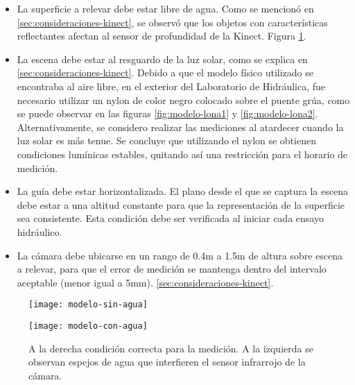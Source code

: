 \begin{itemize}

\item La superficie a relevar debe estar libre de agua. Como se mencionó en \ref{sec:consideraciones-kinect}, se observó que los objetos con características reflectantes afectan al sensor de profundidad de la Kinect. Figura \ref{fig:modelo-condiciones-agua}.

\item La escena debe estar al resguardo de la luz solar, como se explica en \ref{sec:consideraciones-kinect}. Debido a que el modelo físico utilizado se encontraba al aire libre, en el exterior del Laboratorio de Hidráulica, fue necesario utilizar un nylon de color negro colocado sobre el puente grúa, como se puede observar en las figuras \ref{fig:modelo-lona1} y \ref{fig:modelo-lona2}. Alternativamente, se considero realizar las mediciones al atardecer cuando la luz solar es más tenue. Se concluye que utilizando el nylon se obtienen condiciones lumínicas estables, quitando así una restricción para el horario de medición.

\item La guía debe estar horizontalizada. El plano desde el que se captura la escena debe estar a una altitud constante para que la representación de la superficie sea consistente. Esta condición debe ser verificada al iniciar cada ensayo hidráulico.

\item La cámara debe ubicarse en un rango de 0.4m a 1.5m de altura sobre escena a relevar, para que el error de medición se mantenga dentro del intervalo aceptable (menor igual a 5mm). \ref{sec:consideraciones-kinect}.

\end{itemize}

\begin{figure}[h]
\centering
\begin{minipage}[t]{.45\textwidth}
\begin{center}
\texttt{[image: modelo-sin-agua]} %
\end{center}
\end{minipage}
\hfill
\begin{minipage}[t]{.45\textwidth}
\begin{center}
\texttt{[image: modelo-con-agua]} %
\end{center}
\end{minipage}
\hfill
\caption{A la derecha condición correcta para la medición. A la izquierda se observan espejos de agua que interfieren el sensor infrarrojo de la cámara.}
\label{fig:modelo-condiciones-agua}
\end{figure}

